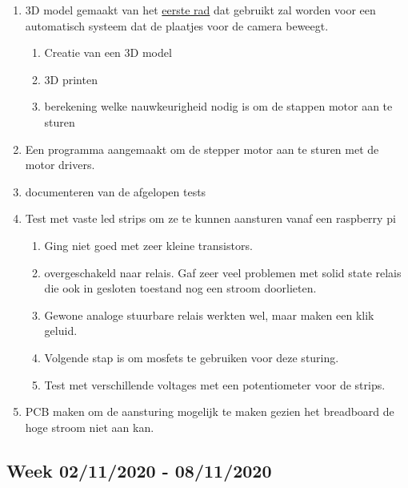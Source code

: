 \documentclass{scrartcl}
\begin{document}
\begin{enumerate}[1]
\item 3D model gemaakt van het \href{../../Camera_setup/Tool_Holder/Wheel_Holder/first_wheel_holder.tex}{eerste rad} dat gebruikt zal worden voor een automatisch systeem dat de plaatjes voor de camera beweegt.
	\begin{enumerate}[a]
	\item Creatie van een 3D model
	\item 3D printen 
	\item berekening welke nauwkeurigheid nodig is om de stappen motor aan te sturen
	\end{enumerate}
\item Een programma aangemaakt om de stepper motor aan te sturen met de motor drivers. 
\item documenteren van de afgelopen tests
\item Test met vaste led strips om ze te kunnen aansturen vanaf een raspberry pi
	\begin{enumerate}[a]
	\item Ging niet goed met zeer kleine transistors. 
	\item overgeschakeld naar relais. Gaf zeer veel problemen met solid state relais die ook in gesloten toestand nog een stroom doorlieten.
	\item Gewone analoge stuurbare relais werkten wel, maar maken een klik geluid. 
	\item Volgende stap is om mosfets te gebruiken voor deze sturing.
	\item Test met verschillende voltages met een potentiometer voor de strips.
	\end{enumerate}
\item PCB maken om de aansturing mogelijk te maken gezien het breadboard de hoge stroom niet aan kan. 
\end{enumerate}


\subsection{Week 02/11/2020 - 08/11/2020}
\end{document}
